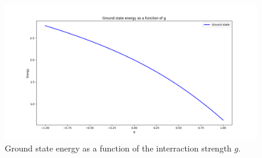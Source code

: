 \documentclass[a4paper,12pt]{article}
\begin{document}
\begin{figure}[h]
    \centering
    \includegraphics[scale = 0.5]{Figure_2.png}
    \caption{Ground state energy as a function of the interraction strength $g$.}
    \label{fig:fig2}
\end{figure}
\end{document}
